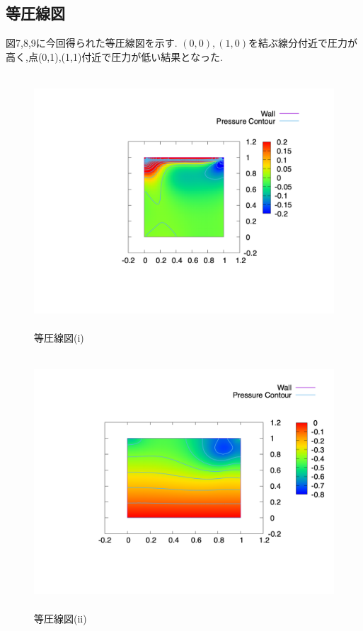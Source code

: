 \documentclass[upLaTeX,a4paper]{jsarticle}
\begin{document}
\subsection{等圧線図}
図7,8,9に今回得られた等圧線図を示す.
$(0,0),(1,0)$を結ぶ線分付近で圧力が高く,点(0,1),(1,1)付近で圧力が低い結果となった.
\begin{figure}[H]
  \centering
  \includegraphics[height=9.5cm]{outputs/img/p_re50.png}
  \caption{等圧線図(i)}
  \label{fig:p_re50}
\end{figure}
\begin{figure}[H]
  \centering
  \includegraphics[height=9.5cm]{outputs/img/p_re200.png}
  \caption{等圧線図(ii)}
  \label{fig:p_re200}
\end{figure}
\end{document}
